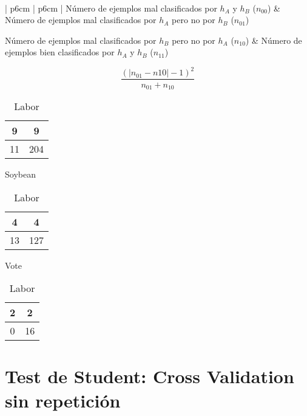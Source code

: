 \documentclass[10pt, a4paper,spanish]{article}
\begin{document}
		\paragraph{}
		\begin{center}
			\begin{tabular}{ | p{6cm} | p{6cm} | }
				\hline
					Número de ejemplos mal clasificados por $h_A$  y $h_B$ ($n_{00}$) &
					Número de ejemplos mal clasificados por $h_A$  pero no por $h_B$ ($n_{01}$) \\ \hline

					Número de ejemplos mal clasificados por $h_B$ pero no por $h_A$ ($n_{10}$) &
					Número de ejemplos bien clasificados por $h_A$  y $h_B$ ($n_{11}$)\\
				\hline
			\end{tabular}
		\end{center}


		\[
		\frac{(|n_{01}-n{10}|-1)^2}{n_{01}+n_{10}}
		\]


		\begin{table}[ht]
			\begin{minipage}[b]{0.3\linewidth}
				\centering
				\begin{tabular}{ | c | c | }
					\hline
					9 & 9 \\ \hline
					11 & 204 \\
					\hline
				\end{tabular}
				\caption{Soybean}
			\end{minipage}\hfill
			\begin{minipage}[b]{0.3\linewidth}
				\centering
				\begin{tabular}{ | c | c | }
					\hline
					4 & 4 \\ \hline
					13 & 127 \\
					\hline
				\end{tabular}
				\caption{Vote}
			\end{minipage}\hfill
			\begin{minipage}[b]{0.3\linewidth}
				\centering
				\begin{tabular}{ | c | c | }
					\hline
					2 & 2 \\ \hline
					0 & 16 \\
					\hline
				\end{tabular}
				\caption{Labor}
			\end{minipage}
		\end{table}

	\section{Test de Student: Cross Validation sin repetición}
\end{document}
